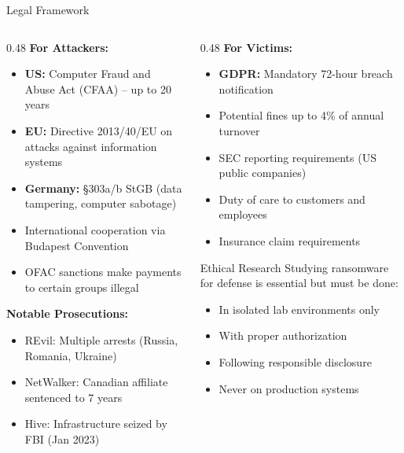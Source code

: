 \documentclass[aspectratio=169]{beamer}
\begin{document}
\begin{frame}{Legal Framework}
  \begin{columns}[T]
    \begin{column}{0.48\textwidth}
      \textbf{For Attackers:}
      \begin{itemize}
        \item \textbf{US:} Computer Fraud and Abuse Act (CFAA) -- up to 20 years
        \item \textbf{EU:} Directive 2013/40/EU on attacks against information systems
        \item \textbf{Germany:} \S 303a/b StGB (data tampering, computer sabotage)
        \item International cooperation via Budapest Convention
        \item OFAC sanctions make payments to certain groups illegal
      \end{itemize}

      \vspace{0.3em}
      \textbf{Notable Prosecutions:}
      \begin{itemize}
        \item REvil: Multiple arrests (Russia, Romania, Ukraine)
        \item NetWalker: Canadian affiliate sentenced to 7 years
        \item Hive: Infrastructure seized by FBI (Jan 2023)
      \end{itemize}
    \end{column}
    \begin{column}{0.48\textwidth}
      \textbf{For Victims:}
      \begin{itemize}
        \item \textbf{GDPR:} Mandatory 72-hour breach notification
        \item Potential fines up to 4\% of annual turnover
        \item SEC reporting requirements (US public companies)
        \item Duty of care to customers and employees
        \item Insurance claim requirements
      \end{itemize}

      \vspace{0.5em}
      \begin{warnbox}{Ethical Research}
        Studying ransomware for defense is essential but must be done:
        \begin{itemize}
          \item In isolated lab environments only
          \item With proper authorization
          \item Following responsible disclosure
          \item Never on production systems
        \end{itemize}
      \end{warnbox}
    \end{column}
  \end{columns}
\end{frame}
\end{document}
